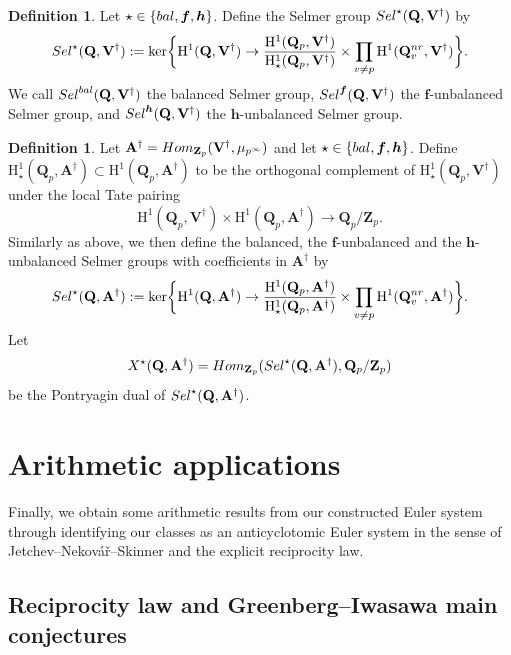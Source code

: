 \documentclass[10pt,letterpaper]{amsart}
\theoremstyle{plain}
\theoremstyle{definition}
\newtheorem{defn}[thm]{Definition}
\theoremstyle{definition}
\theoremstyle{plain}
\theoremstyle{plain}
\theoremstyle{plain}
\theoremstyle{remark}
\numberwithin{equation}{section}
\newcommand{\rH}{{\mathrm{H}}}
\newcommand{\Vdag}{{\mathbf{V}^\dagger}}
\newcommand{\Adag}{{\mathbf{A}^\dagger}}
\newcommand{\Q}{\mathbf{Q}}
\newcommand{\Z}{\mathbf{Z}}
\newcommand{\bff}{{\boldsymbol{f}}}
\newcommand{\bfh}{{\boldsymbol{h}}}
\begin{document}
\begin{defn}\label{def:Sel-bu}
Let $\star\in\{{\rm bal},\bff,\bfh\}$. Define the Selmer group ${\rm Sel}^\star(\Q,\Vdag)$ by
\[
{\rm Sel}^\star(\Q,\Vdag):=\ker\biggl\{\rH^1(\Q,\Vdag)\rightarrow\frac{\rH^1(\Q_p,\Vdag)}{\rH^1_\star(\Q_p,\Vdag)}\times\prod_{v\neq p}\rH^1(\Q_v^{\rm nr},\Vdag)\biggr\}.
\]
We call ${\rm Sel}^{\rm bal}(\Q,\Vdag)$ the {balanced} Selmer group, ${\rm Sel}^{\bff}(\Q,\Vdag)$ the {$\bff$-unbalanced} Selmer group, and ${\rm Sel}^{\bfh}(\Q,\Vdag)$ the {$\bfh$-unbalanced} Selmer group.
\end{defn}
\begin{defn}
Let $\Adag={\rm Hom}_{\Z_p}(\Vdag,\mu_{p^\infty})$ and let $\star\in\{{\rm bal},\bff,\bfh\}$. Define $\rH^1_{\star}(\Q_p,\Adag)\subset\rH^1(\Q_p,\Adag)$ to be the orthogonal complement of $\rH^1_\star(\Q_p,\Vdag)$ under the local Tate pairing
\[
\rH^1(\Q_p,\Vdag)\times\rH^1(\Q_p,\Adag)\rightarrow\Q_p/\Z_p.
\]
Similarly as above, we then define the balanced, the $\bff$-unbalanced and the $\bfh$-unbalanced  Selmer groups with coefficients in $\Adag$ by
\[
{\rm Sel}^\star(\Q,\Adag):=\ker\biggl\{\rH^1(\Q,\Adag)\rightarrow\frac{\rH^1(\Q_p,\Adag)}{\rH_\star^1(\Q_p,\Adag)}\times\prod_{v\neq p}\rH^1(\Q_v^{\rm nr},\Adag)\biggr\}.
\]
Let $$X^\star(\Q,\Adag)={\rm Hom}_{\Z_p}({\rm Sel}^\star(\Q,\Adag),\Q_p/\Z_p)$$ be the Pontryagin dual of ${\rm Sel}^\star(\Q,\Adag)$.
 
\end{defn}

\section{Arithmetic applications}
Finally, we obtain some arithmetic results from our constructed Euler system through identifying our classes as an anticyclotomic Euler system in the sense of Jetchev--Nekov\'a{\v r}--Skinner \cite{JNS} and the explicit reciprocity law.

\subsection{Reciprocity law and Greenberg--Iwasawa main conjectures}
\label{subsec:diag}
\end{document}
